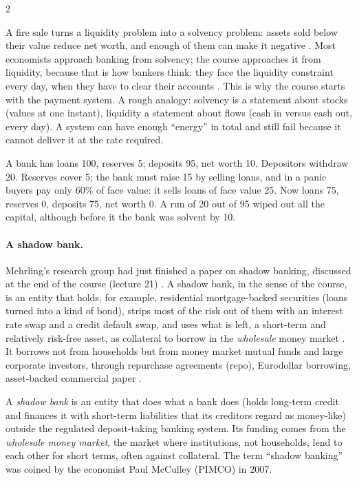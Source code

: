 \begin{paracol}{2}
\begin{intuition}
A fire sale turns a liquidity problem into a solvency problem: assets sold below their value reduce net worth,
and enough of them can make it negative . Most economists approach banking from solvency; the
course approaches it from liquidity, because that is how bankers think: they face the liquidity constraint every
day, when they have to clear their accounts . This is why the course starts with the payment system.
A rough analogy: solvency is a statement about stocks (values at one instant), liquidity a statement about flows
(cash in versus cash out, every day). A system can have enough ``energy'' in total and still fail because it
cannot deliver it at the rate required.
\end{intuition}\begin{example}
A bank has loans 100, reserves 5; deposits 95, net worth 10. Depositors withdraw 20. Reserves cover 5; the bank
must raise 15 by selling loans, and in a panic buyers pay only 60\% of face value: it sells loans of face value
25. Now loans 75, reserves 0, deposits 75, net worth 0. A run of 20 out of 95 wiped out all the capital, although
before it the bank was solvent by 10.
\end{example}

\paragraph{A shadow bank.} Mehrling's research group had just finished a paper on shadow banking, discussed at the
end of the course (lecture 21) . A shadow bank, in the sense of the course, is an entity that holds,
for example, residential mortgage-backed securities (loans turned into a kind of bond), strips most of the risk
out of them with an interest rate swap and a credit default swap, and uses what is left, a short-term and
relatively risk-free asset, as collateral to borrow in the \emph{wholesale} money market . It
borrows not from households but from money market mutual funds and large corporate investors, through repurchase
agreements (repo), Eurodollar borrowing, asset-backed commercial paper .

\begin{definition}\label{def:fp-shadow}
A \emph{shadow bank} is an entity that does what a bank does (holds long-term credit and finances it with
short-term liabilities that its creditors regard as money-like) outside the regulated deposit-taking banking
system. Its funding comes from the \emph{wholesale money market}, the market where institutions, not households,
lend to each other for short terms, often against collateral. The term ``shadow banking'' was coined by the
economist Paul McCulley (PIMCO) in 2007.
\end{definition}


\end{paracol}
